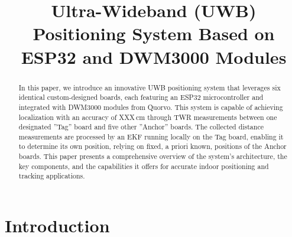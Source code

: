 \documentclass[conference, a4paper]{IEEEtran}
\begin{document}
\renewcommand{\baselinestretch}{0.97} %

\title{Ultra-Wideband (UWB) Positioning System Based on ESP32 and DWM3000 Modules}

\author{  
   \and
   
  }

\maketitle

\begin{abstract}
  In this paper, we introduce an innovative \ac{UWB} positioning system
  that leverages six identical custom-designed boards,
  each featuring an ESP32 microcontroller and integrated with DWM3000
  modules from Quorvo.
  \newline
  This system is capable of achieving localization with an accuracy of XXX\,cm through \ac{TWR}
  measurements between one designated ''Tag'' board and five other ''Anchor'' boards.
  The collected distance measurements are processed by an \ac{EKF} running locally
  on the Tag board, enabling it to determine its own position,
  relying on fixed, a priori known, positions of the Anchor boards.
  \newline
  This paper presents a comprehensive overview of the system's architecture,
  the key components, and the capabilities it offers for accurate
  indoor positioning and tracking applications.
\end{abstract}


\IEEEpeerreviewmaketitle


\section{Introduction}
\label{sec:Introduction}
\end{document}

